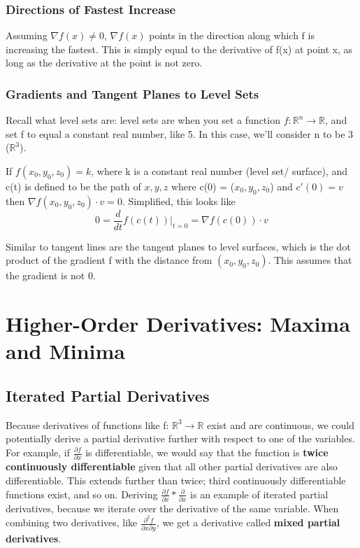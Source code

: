 \documentclass{article}
\begin{document}
\subsubsection{Directions of Fastest Increase}
Assuming $\nabla f(x) \neq 0$, $\nabla f(x)$ points in the direction along which f is increasing the fastest. This is simply equal to the derivative of f(x) at point x, as long as the derivative at the point is not zero.
\subsubsection{Gradients and Tangent Planes to Level Sets}
Recall what level sets are: level sets are when you set a function $f: \mathbb{R}^n \rightarrow \mathbb{R}$, and set f to equal a constant real number, like 5. In this case, we'll consider n to be 3 ($\mathbb{R}^3$).\newline

If $f(x_0,y_0,z_0) = k$, where k is a constant real number (level set/ surface), and c(t) is defined to be the path of $x,y,z$ where c(0) = ($x_0,y_0,z_0$) and $c'(0) = v$ then $\nabla f(x_0,y_0,z_0) \cdot v = 0$. Simplified, this looks like
\[
  0 = \frac{d}{dt} f(c(t))\bigg|_{t=0} = \nabla f(c(0)) \cdot v
\]

Similar to tangent lines are the tangent planes to level surfaces, which is the dot product of the gradient f with the distance from $(x_0,y_0,z_0)$. This assumes that the gradient is not 0.

\section{Higher-Order Derivatives: Maxima and Minima}
\subsection{Iterated Partial Derivatives}
Because derivatives of functions like f: $\mathbb{R}^3 \rightarrow \mathbb{R}$ exist and are continuous, we could potentially derive a partial derivative further with respect to one of the variables. For example, if $\frac{\partial f}{\partial x}$ is differentiable, we would say that the function is \textbf{twice continuously differentiable} given that all other partial derivatives are also differentiable. This extends further than twice; third continuously differentiable functions exist, and so on. Deriving $\frac{\partial f}{\partial x} * \frac{\partial }{\partial x}$ is an example of iterated partial derivatives, because we iterate over the derivative of the same variable. When combining two derivatives, like $\frac{\partial^2 f}{\partial x \partial y}$, we get a derivative called \textbf{mixed partial derivatives}.
\end{document}
